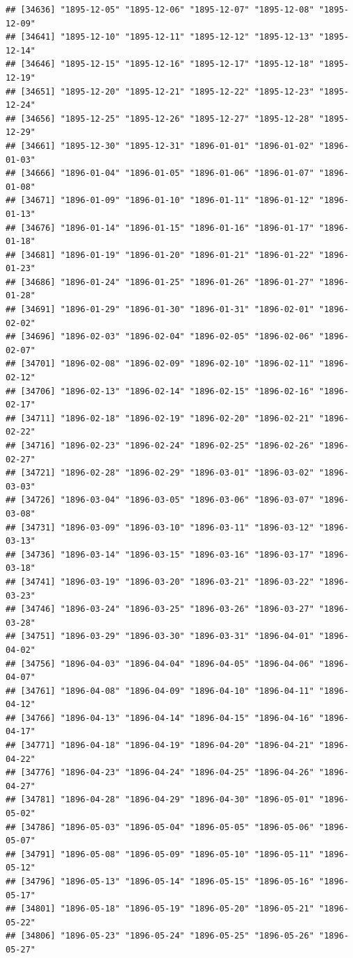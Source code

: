 \documentclass{article}\usepackage[]{graphicx}\usepackage[]{color}
\makeatletter
\newenvironment{kframe}{%
 \def\at@end@of@kframe{}%
 \ifinner\ifhmode%
  \def\at@end@of@kframe{\end{minipage}}%
  \begin{minipage}{\columnwidth}%
 \fi\fi%
 \def\FrameCommand##1{\hskip\@totalleftmargin \hskip-\fboxsep
 \colorbox{shadecolor}{##1}\hskip-\fboxsep
     \hskip-\linewidth \hskip-\@totalleftmargin \hskip\columnwidth}%
 \MakeFramed {\advance\hsize-\width
   \@totalleftmargin\z@ \linewidth\hsize
   \@setminipage}}%
 {\par\unskip\endMakeFramed%
 \at@end@of@kframe}
\newenvironment{knitrout}{}{} %
\makeatother
\begin{document}
\begin{description}
\begin{knitrout}
\begin{kframe}
\begin{verbatim}
## [34636] "1895-12-05" "1895-12-06" "1895-12-07" "1895-12-08" "1895-12-09"
## [34641] "1895-12-10" "1895-12-11" "1895-12-12" "1895-12-13" "1895-12-14"
## [34646] "1895-12-15" "1895-12-16" "1895-12-17" "1895-12-18" "1895-12-19"
## [34651] "1895-12-20" "1895-12-21" "1895-12-22" "1895-12-23" "1895-12-24"
## [34656] "1895-12-25" "1895-12-26" "1895-12-27" "1895-12-28" "1895-12-29"
## [34661] "1895-12-30" "1895-12-31" "1896-01-01" "1896-01-02" "1896-01-03"
## [34666] "1896-01-04" "1896-01-05" "1896-01-06" "1896-01-07" "1896-01-08"
## [34671] "1896-01-09" "1896-01-10" "1896-01-11" "1896-01-12" "1896-01-13"
## [34676] "1896-01-14" "1896-01-15" "1896-01-16" "1896-01-17" "1896-01-18"
## [34681] "1896-01-19" "1896-01-20" "1896-01-21" "1896-01-22" "1896-01-23"
## [34686] "1896-01-24" "1896-01-25" "1896-01-26" "1896-01-27" "1896-01-28"
## [34691] "1896-01-29" "1896-01-30" "1896-01-31" "1896-02-01" "1896-02-02"
## [34696] "1896-02-03" "1896-02-04" "1896-02-05" "1896-02-06" "1896-02-07"
## [34701] "1896-02-08" "1896-02-09" "1896-02-10" "1896-02-11" "1896-02-12"
## [34706] "1896-02-13" "1896-02-14" "1896-02-15" "1896-02-16" "1896-02-17"
## [34711] "1896-02-18" "1896-02-19" "1896-02-20" "1896-02-21" "1896-02-22"
## [34716] "1896-02-23" "1896-02-24" "1896-02-25" "1896-02-26" "1896-02-27"
## [34721] "1896-02-28" "1896-02-29" "1896-03-01" "1896-03-02" "1896-03-03"
## [34726] "1896-03-04" "1896-03-05" "1896-03-06" "1896-03-07" "1896-03-08"
## [34731] "1896-03-09" "1896-03-10" "1896-03-11" "1896-03-12" "1896-03-13"
## [34736] "1896-03-14" "1896-03-15" "1896-03-16" "1896-03-17" "1896-03-18"
## [34741] "1896-03-19" "1896-03-20" "1896-03-21" "1896-03-22" "1896-03-23"
## [34746] "1896-03-24" "1896-03-25" "1896-03-26" "1896-03-27" "1896-03-28"
## [34751] "1896-03-29" "1896-03-30" "1896-03-31" "1896-04-01" "1896-04-02"
## [34756] "1896-04-03" "1896-04-04" "1896-04-05" "1896-04-06" "1896-04-07"
## [34761] "1896-04-08" "1896-04-09" "1896-04-10" "1896-04-11" "1896-04-12"
## [34766] "1896-04-13" "1896-04-14" "1896-04-15" "1896-04-16" "1896-04-17"
## [34771] "1896-04-18" "1896-04-19" "1896-04-20" "1896-04-21" "1896-04-22"
## [34776] "1896-04-23" "1896-04-24" "1896-04-25" "1896-04-26" "1896-04-27"
## [34781] "1896-04-28" "1896-04-29" "1896-04-30" "1896-05-01" "1896-05-02"
## [34786] "1896-05-03" "1896-05-04" "1896-05-05" "1896-05-06" "1896-05-07"
## [34791] "1896-05-08" "1896-05-09" "1896-05-10" "1896-05-11" "1896-05-12"
## [34796] "1896-05-13" "1896-05-14" "1896-05-15" "1896-05-16" "1896-05-17"
## [34801] "1896-05-18" "1896-05-19" "1896-05-20" "1896-05-21" "1896-05-22"
## [34806] "1896-05-23" "1896-05-24" "1896-05-25" "1896-05-26" "1896-05-27"

\end{verbatim}
\end{kframe}
\end{knitrout}
\end{description}
\end{document}
